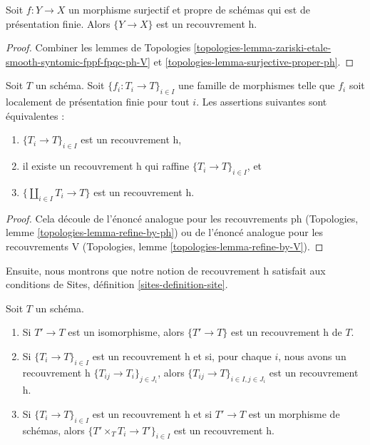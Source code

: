 \begin{lemma}
\label{lemma-surjective-proper-finite-presentation-h}
Soit $f : Y \to X$ un morphisme surjectif et propre de schémas
qui est de présentation finie. Alors $\{Y \to X\}$ est un recouvrement h.
\end{lemma}

\begin{proof}
Combiner les lemmes de Topologies
\ref{topologies-lemma-zariski-etale-smooth-syntomic-fppf-fpqc-ph-V} et
\ref{topologies-lemma-surjective-proper-ph}.
\end{proof}

\begin{lemma}
\label{lemma-refine-by-h}
Soit $T$ un schéma. Soit $\{f_i : T_i \to T\}_{i \in I}$ une famille
de morphismes telle que $f_i$ soit localement de présentation finie pour tout $i$.
Les assertions suivantes sont équivalentes :
\begin{enumerate}
\item $\{T_i \to T\}_{i \in I}$ est un recouvrement h,
\item il existe un recouvrement h qui raffine $\{T_i \to T\}_{i \in I}$, et
\item $\{\coprod_{i \in I} T_i \to T\}$ est un recouvrement h.
\end{enumerate}
\end{lemma}

\begin{proof}
Cela découle de l'énoncé analogue pour les recouvrements ph
(Topologies, lemme \ref{topologies-lemma-refine-by-ph})
ou de l'énoncé analogue pour les recouvrements V
(Topologies, lemme \ref{topologies-lemma-refine-by-V}).
\end{proof}

\noindent
Ensuite, nous montrons que notre notion de recouvrement h satisfait aux conditions de
Sites, définition \ref{sites-definition-site}.

\begin{lemma}
\label{lemma-h}
Soit $T$ un schéma.
\begin{enumerate}
\item Si $T' \to T$ est un isomorphisme, alors $\{T' \to T\}$
est un recouvrement h de $T$.
\item Si $\{T_i \to T\}_{i\in I}$ est un recouvrement h et si, pour chaque
$i$, nous avons un recouvrement h $\{T_{ij} \to T_i\}_{j\in J_i}$, alors
$\{T_{ij} \to T\}_{i \in I, j\in J_i}$ est un recouvrement h.
\item Si $\{T_i \to T\}_{i\in I}$ est un recouvrement h
et si $T' \to T$ est un morphisme de schémas, alors
$\{T' \times_T T_i \to T'\}_{i\in I}$ est un recouvrement h.
\end{enumerate}
\end{lemma}

